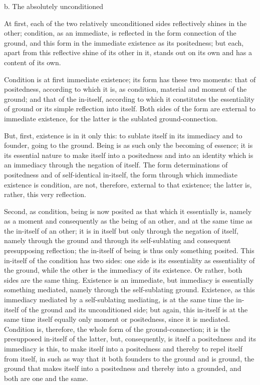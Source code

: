 b. The absolutely unconditioned

At first, each of the two relatively unconditioned sides
reflectively shines in the other;
condition, as an immediate, is reflected
in the form connection of the ground,
and this form in the immediate existence as its positedness;
but each, apart from this reflective shine of its other in it,
stands out on its own and has a content of its own.

Condition is at first immediate existence;
its form has these two moments:
that of positedness, according to which it is, as condition,
material and moment of the ground;
and that of the in-itself, according to which
it constitutes the essentiality of ground
or its simple reflection into itself.
Both sides of the form are external to immediate existence,
for the latter is the sublated ground-connection.

But, first, existence is in it only this:
to sublate itself in its immediacy
and to founder, going to the ground.
Being is as such only the becoming of essence;
it is its essential nature to
make itself into a positedness
and into an identity which is
an immediacy through the negation of itself.
The form determinations of positedness
and of self-identical in-itself,
the form through which immediate existence is condition,
are not, therefore, external to that existence;
the latter is, rather, this very reflection.

Second, as condition, being is now posited as
that which it essentially is,
namely as a moment and consequently as the being of an other,
and at the same time as the in-itself of an other;
it is in itself but only through the negation of itself,
namely through the ground and through its self-sublating
and consequent presupposing reflection;
the in-itself of being is thus only something posited.
This in-itself of the condition has two sides:
one side is its essentiality as essentiality of the ground,
while the other is the immediacy of its existence.
Or rather, both sides are the same thing.
Existence is an immediate, but immediacy
is essentially something mediated,
namely through the self-sublating ground.
Existence, as this immediacy mediated by a self-sublating mediating,
is at the same time the in-itself of the ground and its unconditioned side;
but again, this in-itself is at the same time itself
equally only moment or positedness, since it is mediated.
Condition is, therefore, the whole form of the ground-connection;
it is the presupposed in-itself of the latter,
but, consequently, is itself a positedness
and its immediacy is this, to make itself into a positedness
and thereby to repel itself from itself,
in such as way that it both founders to the ground and is ground,
the ground that makes itself into a positedness
and thereby into a grounded, and both are one and the same.

